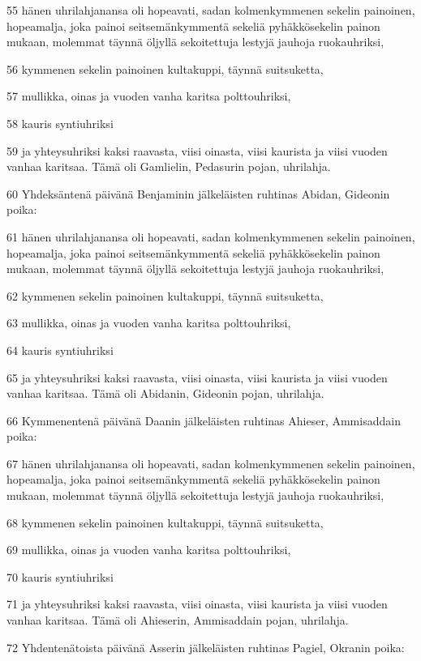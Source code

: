 \par 55 hänen uhrilahjanansa oli hopeavati, sadan kolmenkymmenen sekelin painoinen, hopeamalja, joka painoi seitsemänkymmentä sekeliä pyhäkkösekelin painon mukaan, molemmat täynnä öljyllä sekoitettuja lestyjä jauhoja ruokauhriksi,
\par 56 kymmenen sekelin painoinen kultakuppi, täynnä suitsuketta,
\par 57 mullikka, oinas ja vuoden vanha karitsa polttouhriksi,
\par 58 kauris syntiuhriksi
\par 59 ja yhteysuhriksi kaksi raavasta, viisi oinasta, viisi kaurista ja viisi vuoden vanhaa karitsaa. Tämä oli Gamlielin, Pedasurin pojan, uhrilahja.
\par 60 Yhdeksäntenä päivänä Benjaminin jälkeläisten ruhtinas Abidan, Gideonin poika:
\par 61 hänen uhrilahjanansa oli hopeavati, sadan kolmenkymmenen sekelin painoinen, hopeamalja, joka painoi seitsemänkymmentä sekeliä pyhäkkösekelin painon mukaan, molemmat täynnä öljyllä sekoitettuja lestyjä jauhoja ruokauhriksi,
\par 62 kymmenen sekelin painoinen kultakuppi, täynnä suitsuketta,
\par 63 mullikka, oinas ja vuoden vanha karitsa polttouhriksi,
\par 64 kauris syntiuhriksi
\par 65 ja yhteysuhriksi kaksi raavasta, viisi oinasta, viisi kaurista ja viisi vuoden vanhaa karitsaa. Tämä oli Abidanin, Gideonin pojan, uhrilahja.
\par 66 Kymmenentenä päivänä Daanin jälkeläisten ruhtinas Ahieser, Ammisaddain poika:
\par 67 hänen uhrilahjanansa oli hopeavati, sadan kolmenkymmenen sekelin painoinen, hopeamalja, joka painoi seitsemänkymmentä sekeliä pyhäkkösekelin painon mukaan, molemmat täynnä öljyllä sekoitettuja lestyjä jauhoja ruokauhriksi,
\par 68 kymmenen sekelin painoinen kultakuppi, täynnä suitsuketta,
\par 69 mullikka, oinas ja vuoden vanha karitsa polttouhriksi,
\par 70 kauris syntiuhriksi
\par 71 ja yhteysuhriksi kaksi raavasta, viisi oinasta, viisi kaurista ja viisi vuoden vanhaa karitsaa. Tämä oli Ahieserin, Ammisaddain pojan, uhrilahja.
\par 72 Yhdentenätoista päivänä Asserin jälkeläisten ruhtinas Pagiel, Okranin poika:
